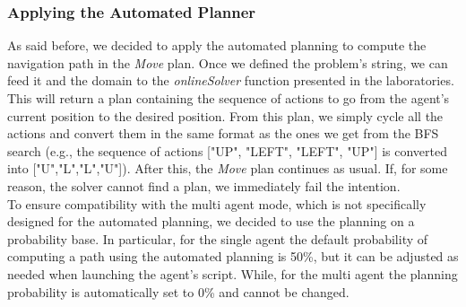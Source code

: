         \subsubsection{Applying the Automated Planner}
            As said before, we decided to apply the automated planning to compute the navigation path in the \textit{Move} plan. Once we defined the problem's string, we can feed it and the domain to the \textit{onlineSolver} function presented in the laboratories. This will return a plan containing the sequence of actions to go from the agent's current position to the desired position. From this plan, we simply cycle all the actions and convert them in the same format as the ones we get from the BFS search (e.g., the sequence of actions ["UP", "LEFT", "LEFT", "UP"] is converted into ["U","L","L","U"]). After this, the \textit{Move} plan continues as usual. If, for some reason, the solver cannot find a plan, we immediately fail the intention.
            \medskip\\
            To ensure compatibility with the multi agent mode, which is not specifically designed for the automated planning, we decided to use the planning on a probability base. In particular, for the single agent the default probability of computing a path using the automated planning is 50\%, but it can be adjusted as needed when launching the agent's script. While, for the multi agent the planning probability is automatically set to 0\% and cannot be changed.


